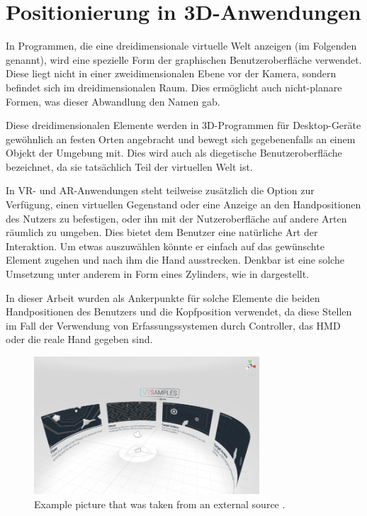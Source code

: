 		
		
	\section{Positionierung in 3D-Anwendungen}\label{chapter:3dPos}
		
		In Programmen, die eine dreidimensionale virtuelle Welt anzeigen (im Folgenden  genannt), wird eine spezielle Form der graphischen Benutzeroberfläche verwendet. Diese liegt nicht in einer zweidimensionalen Ebene vor der Kamera, sondern befindet sich im dreidimensionalen Raum. Dies ermöglicht auch nicht-planare Formen, was dieser Abwandlung den Namen  gab.
		
		Diese dreidimensionalen Elemente werden in 3D-Programmen für Desktop-Geräte gewöhnlich an festen Orten angebracht und bewegt sich gegebenenfalls an einem Objekt der Umgebung mit. Dies wird auch als diegetische Benutzeroberfläche bezeichnet, da sie tatsächlich Teil der virtuellen Welt ist.
		
		In VR- und AR-Anwendungen steht teilweise zusätzlich die Option zur Verfügung, einen virtuellen Gegenstand oder eine Anzeige an den Handpositionen des Nutzers zu befestigen, oder ihn mit der Nutzeroberfläche auf andere Arten räumlich zu umgeben. Dies bietet dem Benutzer eine natürliche Art der Interaktion. Um etwas auszuwählen könnte er einfach auf das gewünschte Element zugehen und nach ihm die Hand ausstrecken. Denkbar ist eine solche Umsetzung unter anderem in Form eines Zylinders, wie in  dargestellt.
		
		In dieser Arbeit wurden als Ankerpunkte für solche Elemente die beiden Handpositionen des Benutzers und die Kopfposition verwendet, da diese Stellen im Fall der Verwendung von Erfassungssystemen durch Controller, das HMD oder die reale Hand gegeben sind.
		
		\begin{figure}[htbp]
			\centering
			\includegraphics[width=0.75\textwidth]{figures/cylinder_mapping.png}
			\caption{Example picture that was taken from an external source .}
			\label{fig:cylinder_mapping}
		\end{figure}
